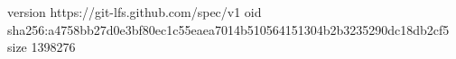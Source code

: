 version https://git-lfs.github.com/spec/v1
oid sha256:a4758bb27d0e3bf80ec1c55eaea7014b510564151304b2b3235290dc18db2cf5
size 1398276
